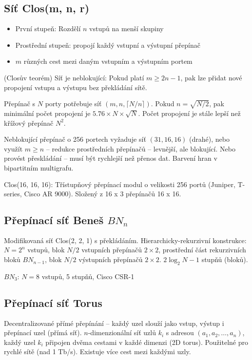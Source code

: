 \documentclass[a4paper, 11pt]{report}
\begin{document}
\subsection{Síť Clos(m, n, r)}
\begin{itemize}
	\item První stupeň: Rozdělí $n$ vstupů na menší skupiny
	\item Prostřední stupeň: propojí každý vstupní a výstupní přepínač
	\item $m$ různých cest mezi daným vstupním a výstupním portem
\end{itemize}

(Closův teorém) Síť je neblokující: Pokud platí $m \geq 2n - 1$, pak lze přidat nové propojení vstupu a výstupu bez překládání sítě.

Přepínač s $N$ porty potřebuje síť $(m, n, \lceil N/n \rceil)$. Pokud $n = \sqrt{N/2}$, pak minimální počet propojení je $5.76 \times N \times \sqrt{N}$. Počet propojení je stále lepší než křížový přepínač $N^2$.

Neblokující přepínač o 256 portech vyžaduje síť $(31, 16, 16)$ (drahé), nebo využít $m \geq n$ -- redukce prostředních přepínačů -- levnější, ale blokující.
Nebo provést přeskládání -- musí být rychlejší než přenos dat. Barvení hran v bipartitním multigrafu.

Clos(16, 16, 16): Třístupňový přepínací modul o velikosti 256 portů (Juniper, T-series, Cisco AR 9000). Složený z 16 x 3 přepínačů 16 x 16.

\subsection{Přepínací síť Beneš $BN_n$}
Modifikovaná síť Clos(2, 2, 1) s překládáním. Hierarchicky-rekurzivní konstrukce: $N=2^n$ vstupů, blok $N/2$ vstupních přepínačů $2\times 2$, prostřední část rekurzivních bloků $BN_{n-1}$, blok $N/2$ výstupních přepínačů $2 \times 2$. $2 \log_2 N - 1$ stupňů (bloků).

$BN_3$: $N = 8$ vstupů, 5 stupňů, Cisco CSR-1

\subsection{Přepínací síť Torus}
Decentralizované přímé přepínání -- každý uzel slouží jako vstup, výstup i přepínací uzel (přímá síť). $n$-dimenzionální síť uzlů $k_i$ s adresou $(a_1, a_2, \dots, a_n)$, každý uzel $k_i$ připojen dvěma cestami v každé dimenzi (2D torus). Použitelné pro rychlé sítě (nad 1 Tb/s). Existuje více cest mezi každými uzly.
\end{document}

